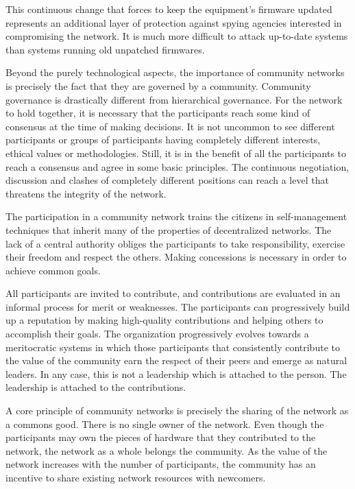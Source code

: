 \documentclass[journal]{IEEEtran}
\begin{document}
This continuous change that forces to keep the equipment's firmware updated represents  an additional layer of protection against spying agencies interested in compromising the network.
It is much more difficult to attack up-to-date systems than systems running old unpatched firmwares.

Beyond the purely technological aspects, the importance of community networks is precisely the fact that they are governed by a community.
Community governance is drastically different from hierarchical governance.
For the network to hold together, it is necessary that the participants reach some kind of consensus at the time of making decisions.
It is not uncommon to see different participants or groups of participants having completely different interests, ethical values or methodologies.
Still, it is in the benefit of all the participants to reach a consensus and agree in some basic principles.
The continuous negotiation, discussion and clashes of completely different positions can reach a level that threatens the integrity of the network.

The participation in a community network trains the citizens in self-management techniques that inherit many of the properties of decentralized networks.
The lack of a central authority obliges the participants to take responsibility, exercise their freedom and respect the others.
Making concessions is necessary in order to achieve common goals.

All participants are invited to contribute, and contributions are evaluated in an informal process for merit or weaknesses.
The participants can progressively build up a reputation by making high-quality contributions and helping others to accomplish their goals.
The organization progressively evolves towards a meritocratic systems in which those participants that consistently contribute to the value of the community earn the respect of their peers and emerge as natural leaders.
In any case, this is not a leadership which is attached to the person. 
The leadership is attached to the contributions.

A core principle of community networks is precisely the sharing of the network as a commons good.
There is no single owner of the network.
Even though the participants may own the pieces of hardware that they contributed to the network, the network as a whole belongs the community.
As the value of the network increases with the number of participants, the community has an incentive to share existing network resources with newcomers.
\end{document}
